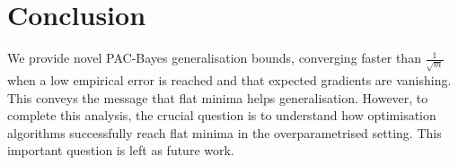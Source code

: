 \section{Conclusion}

We provide novel PAC-Bayes generalisation bounds, converging faster than $\frac{1}{\sqrt{m}}$ when a low empirical error is reached and that expected gradients are vanishing. This conveys the message that flat minima helps generalisation. However, to complete this analysis, the crucial question is to understand how optimisation algorithms successfully reach flat minima in the overparametrised setting. This important question is left as future work.
